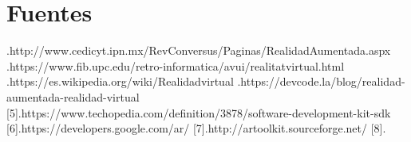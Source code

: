 \section{Fuentes} \noindent
[1].http://www.cedicyt.ipn.mx/RevConversus/Paginas/RealidadAumentada.aspx
\newline
[2].https://www.fib.upc.edu/retro-informatica/avui/realitatvirtual.html \newline
[3].https://es.wikipedia.org/wiki/Realidadvirtual
\newline
[4].https://devcode.la/blog/realidad-aumentada-realidad-virtual
[5].https://www.techopedia.com/definition/3878/software-development-kit-sdk
[6].https://developers.google.com/ar/
[7].http://artoolkit.sourceforge.net/
[8].
